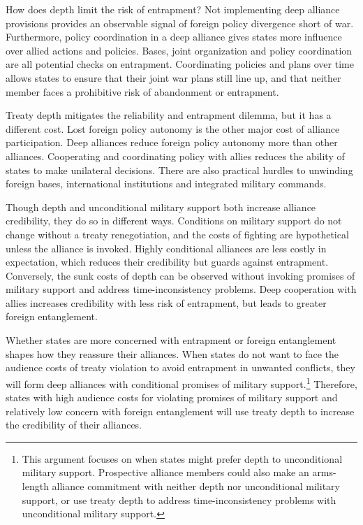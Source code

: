 \documentclass[12pt]{article}
\begin{document}
How does depth limit the risk of entrapment?   
Not implementing deep alliance provisions provides an observable signal of foreign policy divergence short of war.
Furthermore, policy coordination in a deep alliance gives states more influence over allied actions and policies. 
Bases, joint organization and policy coordination are all potential checks on entrapment.
Coordinating policies and plans over time allows states to ensure that their joint war plans still line up, and that neither member faces a prohibitive risk of abandonment or entrapment.  


Treaty depth mitigates the reliability and entrapment dilemma, but it has a different cost. 
Lost foreign policy autonomy is the other major cost of alliance participation. 
Deep alliances reduce foreign policy autonomy more than other alliances.
Cooperating and coordinating policy with allies reduces the ability of states to make unilateral decisions. 
There are also practical hurdles to unwinding foreign bases, international institutions and integrated military commands. 


Though depth and unconditional military support both increase alliance credibility, they do so in different ways. 
Conditions on military support do not change without a treaty renegotiation, and the costs of fighting are hypothetical unless the alliance is invoked.  
Highly conditional alliances are less costly in expectation, which reduces their credibility but guards against entrapment. 
Conversely, the sunk costs of depth can be observed without invoking promises of military support and address time-inconsistency problems.
Deep cooperation with allies increases credibility with less risk of entrapment, but leads to greater foreign entanglement.   


Whether states are more concerned with entrapment or foreign entanglement shapes how they reassure their alliances. 
When states do not want to face the audience costs of treaty violation to avoid entrapment in unwanted conflicts, they will form deep alliances with conditional promises of military support.\footnote{This argument focuses on when states might prefer depth to unconditional military support. Prospective alliance members could also make an arms-length alliance commitment with neither depth nor unconditional military support, or use treaty depth to address time-inconsistency problems with unconditional military support.}
Therefore, states with high audience costs for violating promises of military support and relatively low concern with foreign entanglement will use treaty depth to increase the credibility of their alliances. 
\end{document}
